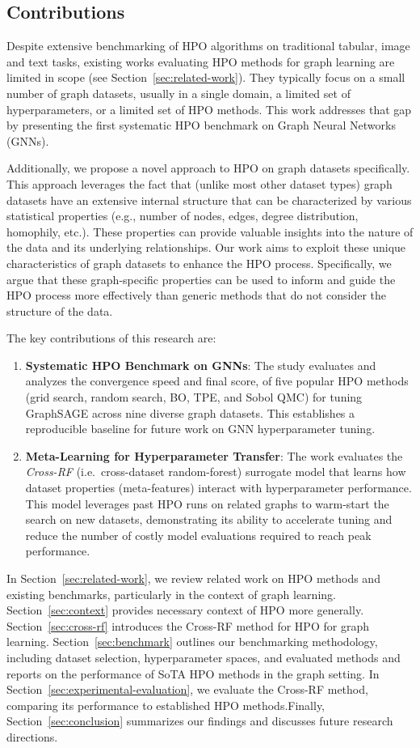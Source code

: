 \subsection{Contributions}

Despite extensive benchmarking of HPO algorithms on traditional tabular, image and text tasks, existing works evaluating HPO methods for graph learning are limited in scope (see Section~\ref{sec:related-work}). They typically focus on a small number of graph datasets, usually in a single domain, a limited set of hyperparameters, or a limited set of HPO methods. This work addresses that gap by presenting the first systematic HPO benchmark on Graph Neural Networks (GNNs).

Additionally, we propose a novel approach to HPO on graph datasets specifically. This approach leverages the fact that (unlike most other dataset types) graph datasets have an extensive internal structure that can be characterized by various statistical properties (e.g., number of nodes, edges, degree distribution, homophily, etc.). These properties can provide valuable insights into the nature of the data and its underlying relationships. Our work aims to exploit these unique characteristics of graph datasets to enhance the HPO process. Specifically, we argue that these graph-specific properties can be used to inform and guide the HPO process more effectively than generic methods that do not consider the structure of the data.

The key contributions of this research are:
\begin{enumerate}
	\item \textbf{Systematic HPO Benchmark on GNNs}: The study evaluates and analyzes the convergence speed and final score, of five popular HPO methods (grid search, random search, BO, TPE, and Sobol QMC) for tuning GraphSAGE across nine diverse graph datasets. This establishes a reproducible baseline for future work on GNN hyperparameter tuning.
	\item \textbf{Meta-Learning for Hyperparameter Transfer}: The work evaluates the \textit{Cross-RF} (i.e.\ cross-dataset random-forest) surrogate model that learns how dataset properties (meta-features) interact with hyperparameter performance. This model leverages past HPO runs on related graphs to warm-start the search on new datasets, demonstrating its ability to accelerate tuning and reduce the number of costly model evaluations required to reach peak performance.
\end{enumerate}

In Section~\ref{sec:related-work}, we review related work on HPO methods and existing benchmarks, particularly in the context of graph learning. Section~\ref{sec:context} provides necessary context of HPO more generally. Section~\ref{sec:cross-rf} introduces the Cross-RF method for HPO for graph learning. Section~\ref{sec:benchmark} outlines our benchmarking methodology, including dataset selection, hyperparameter spaces, and evaluated methods and reports on the performance of SoTA HPO methods in the graph setting. In Section~\ref{sec:experimental-evaluation}, we evaluate the Cross-RF method, comparing its performance to established HPO methods.Finally, Section~\ref{sec:conclusion} summarizes our findings and discusses future research directions.
